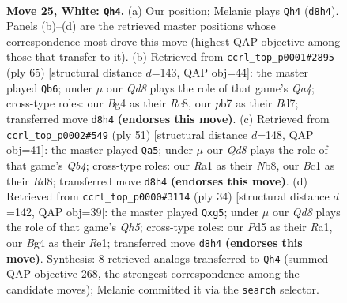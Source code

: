 \documentclass[11pt]{article}
\begin{document}
\clearpage

\begin{figure}[p]\centering
\begin{subfigure}{0.46\textwidth}\centering
\resizebox{\linewidth}{!}{%
\newchessgame
\chessboard[
  setfen={r1bQ4/pppp1ppk/1b1n3p/3P4/6B1/2N2P1P/PPq3P1/R1B2K2 w - - 2 25},
  showmover=false,
  pgfstyle=straightmove, color=movearrow, markmove={d8-h4}
]}
\caption{}
\end{subfigure}\hfill
\begin{subfigure}{0.46\textwidth}\centering
\resizebox{\linewidth}{!}{%
\newchessgame
\chessboard[
  setfen={2r3k1/1p1b1pb1/p6p/q2p1Ppn/3N4/1P1B1PP1/P2Q2KP/B2R4 b - - 1 33},
  showmover=false,
  pgfstyle=straightmove, color=movearrow, markmove={a5-b6}
]}
\caption{}
\end{subfigure}
\\[4pt]
\begin{subfigure}{0.46\textwidth}\centering
\resizebox{\linewidth}{!}{%
\newchessgame
\chessboard[
  setfen={1n1r2k1/p4pp1/1p2pb1p/1q1n4/P4B2/3NP2P/1PB2PP1/1Q3RK1 b - - 0 26},
  showmover=false,
  pgfstyle=straightmove, color=movearrow, markmove={b5-a5}
]}
\caption{}
\end{subfigure}\hfill
\begin{subfigure}{0.46\textwidth}\centering
\resizebox{\linewidth}{!}{%
\newchessgame
\chessboard[
  setfen={r3k2r/1p1b1ppp/1q2p3/2npP1bQ/p7/P6P/1PB2PP1/R1B1R1K1 w kq - 0 18},
  showmover=false,
  pgfstyle=straightmove, color=movearrow, markmove={h5-g5}
]}
\caption{}
\end{subfigure}
\caption{\textbf{Move 25, White: \texttt{Qh4}.} (a) Our position; Melanie plays \texttt{Qh4} (\texttt{d8h4}). Panels (b)--(d) are the retrieved master positions whose correspondence most drove this move (highest QAP objective among those that transfer to it). (b) Retrieved from \texttt{ccrl\_top\_p0001\#2895} (ply 65) [structural distance $d$=143, QAP obj=44]: the master played \texttt{Qb6}; under $\mu$ our \emph{Qd8} plays the role of that game's \emph{Qa4}; cross-type roles: our \emph{B}g4 as their \emph{R}c8, our \emph{p}b7 as their \emph{B}d7; transferred move \texttt{d8h4} \textbf{(endorses this move)}. (c) Retrieved from \texttt{ccrl\_top\_p0002\#549} (ply 51) [structural distance $d$=148, QAP obj=41]: the master played \texttt{Qa5}; under $\mu$ our \emph{Qd8} plays the role of that game's \emph{Qb4}; cross-type roles: our \emph{R}a1 as their \emph{N}b8, our \emph{B}c1 as their \emph{R}d8; transferred move \texttt{d8h4} \textbf{(endorses this move)}. (d) Retrieved from \texttt{ccrl\_top\_p0000\#3114} (ply 34) [structural distance $d$=142, QAP obj=39]: the master played \texttt{Qxg5}; under $\mu$ our \emph{Qd8} plays the role of that game's \emph{Qh5}; cross-type roles: our \emph{P}d5 as their \emph{R}a1, our \emph{B}g4 as their \emph{R}e1; transferred move \texttt{d8h4} \textbf{(endorses this move)}. Synthesis: 8 retrieved analogs transferred to \texttt{Qh4} (summed QAP objective 268, the strongest correspondence among the candidate moves); Melanie committed it via the \texttt{search} selector.}
\label{fig:thought-m48}
\end{figure}
\end{document}
